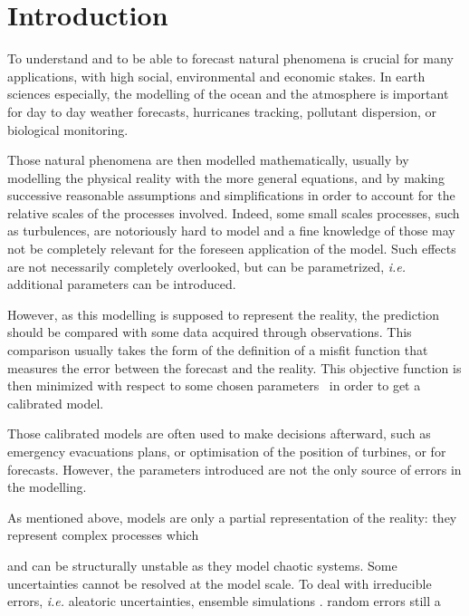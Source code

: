\documentclass[../../Main_ManuscritThese.tex]{subfiles}
\begin{document}
\pagestyle{introStyle}
\chapter*{Introduction}
\TitleBtwLines

{}
\label{chap:Introduction}





To understand and to be able to forecast natural phenomena is crucial
for many applications, with high social, environmental and economic
stakes.  In earth sciences especially, the modelling of the ocean and
the atmosphere is important for day to day weather forecasts,
hurricanes tracking, pollutant dispersion, or biological monitoring.

Those natural phenomena are then modelled mathematically, usually by
modelling the physical reality with the more general equations, and by
making successive reasonable assumptions and simplifications in order
to account for the relative scales of the processes involved. Indeed,
some small scales processes, such as turbulences, are notoriously hard
to model and a fine knowledge of those may not be completely relevant
for the foreseen application of the model. Such effects are not
necessarily completely overlooked, but can be parametrized, \textit{i.e.}
additional parameters can be introduced.

However, as this modelling is supposed to represent the reality, the
prediction should be compared with some data acquired through
observations. This comparison usually takes the form of the definition
of a misfit function that measures the error between the forecast and
the reality. This objective function is then minimized with respect to
some chosen
parameters~\cite{das_estimation_1991,das_variational_1992,boutet_estimation_2015}
in order to get a calibrated model.

Those calibrated models are often used to make decisions afterward,
such as emergency evacuations plans, or optimisation of the position
of turbines, or for forecasts. However, the parameters introduced are
not the only source of errors in the modelling.

As mentioned above, models are only a partial representation of the
reality: they represent complex processes which 

and can be structurally unstable as they model chaotic systems. Some
uncertainties cannot be resolved at the model scale. To deal with
irreducible errors, \emph{i.e.} aleatoric uncertainties, ensemble
simulations \cite{mcwilliams_irreducible_2007}. random errors still a
\cite{zanna_ocean_2011}
\end{document}
